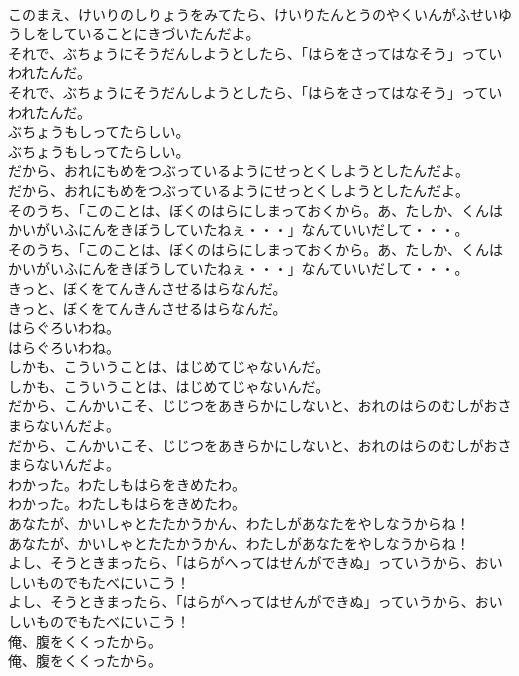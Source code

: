 \documentclass[8pt]{extreport}
\begin{document}
\begin{CJK}{UTF8}{min}
\\	このまえ、けいりのしりょうをみてたら、けいりたんとうのやくいんがふせいゆうしをしていることにきづいたんだよ。
\\	それで、ぶちょうにそうだんしようとしたら、「はらをさってはなそう」っていわれたんだ。
\\	それで、ぶちょうにそうだんしようとしたら、「はらをさってはなそう」っていわれたんだ。
\\	ぶちょうもしってたらしい。
\\	ぶちょうもしってたらしい。
\\	だから、おれにもめをつぶっているようにせっとくしようとしたんだよ。
\\	だから、おれにもめをつぶっているようにせっとくしようとしたんだよ。
\\	そのうち、「このことは、ぼくのはらにしまっておくから。あ、たしか、くんはかいがいふにんをきぼうしていたねぇ・・・」なんていいだして・・・。
\\	そのうち、「このことは、ぼくのはらにしまっておくから。あ、たしか、くんはかいがいふにんをきぼうしていたねぇ・・・」なんていいだして・・・。
\\	きっと、ぼくをてんきんさせるはらなんだ。
\\	きっと、ぼくをてんきんさせるはらなんだ。
\\	はらぐろいわね。
\\	はらぐろいわね。
\\	しかも、こういうことは、はじめてじゃないんだ。
\\	しかも、こういうことは、はじめてじゃないんだ。
\\	だから、こんかいこそ、じじつをあきらかにしないと、おれのはらのむしがおさまらないんだよ。
\\	だから、こんかいこそ、じじつをあきらかにしないと、おれのはらのむしがおさまらないんだよ。
\\	わかった。わたしもはらをきめたわ。
\\	わかった。わたしもはらをきめたわ。
\\	あなたが、かいしゃとたたかうかん、わたしがあなたをやしなうからね！
\\	あなたが、かいしゃとたたかうかん、わたしがあなたをやしなうからね！
\\	よし、そうときまったら、「はらがへってはせんができぬ」っていうから、おいしいものでもたべにいこう！
\\	よし、そうときまったら、「はらがへってはせんができぬ」っていうから、おいしいものでもたべにいこう！
\\	俺、腹をくくったから。
\\	俺、腹をくくったから。

\end{CJK}
\end{document}
